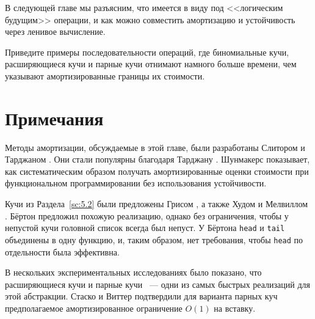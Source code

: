 В следующей главе мы разъясним, что имеется в виду под <<логическим
будущим>> операции, и как можно совместить амортизацию и устойчивость
через ленивое вычисление.

\begin{exercise}\label{ex:5.9}
  Приведите примеры последовательности операций, где биномиальные
  кучи, расширяющиеся кучи и парные кучи отнимают намного больше
  времени, чем указывают амортизированные границы их стоимости.
\end{exercise}

\section{Примечания}

Методы амортизации, обсуждаемые в этой главе, были разработаны
Слитором и Тарджаном \cite{SleatorTarjan1985, SleatorTarjan1986b}. Они
стали популярны благодаря Тарджану \cite{Tarjan1985}. Шунмакерс
\cite{Schoenmakers1992} показывает, как систематическим образом
получать амортизированные оценки стоимости при функциональном
программировании без использования устойчивости.

Кучи из Раздела~\ref{sc:5.2} были предложены Грисом
\cite[с.~250-251]{Gries1981}, а также Худом и Мелвиллом
\cite{HoodMelville1982}. Бёртон \cite{Burton1982} предложил похожую
реализацию, однако без ограничения, чтобы у непустой кучи головной список всегда был
непуст. У Бёртона \lstinline!head! и \lstinline!tail! объединены в
одну функцию, и, таким образом, нет требования, чтобы \lstinline!head!
по отдельности была эффективна.

В нескольких экспериментальных исследованиях было показано, что
расширяющиеся кучи \cite{Jones1986} и парные кучи
\cite{MoretShapiro1991,Liao1992}~--- одни из самых быстрых
реализаций для этой абстракции. Стаско и Виттер
\cite{StaskoVitter1987} подтвердили для варианта парных куч
предполагаемое амортизированное ограничение $O(1)$ на вставку.

